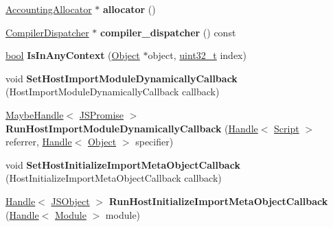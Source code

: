 \begin{DoxyCompactItemize}
\mbox{\label{classv8_1_1internal_1_1Isolate_a5d3cfc27102c773cd317a2c8fdcf499b}} 
\mbox{\hyperlink{classv8_1_1internal_1_1AccountingAllocator}{Accounting\+Allocator}} $\ast$ {\bfseries allocator} ()
\item 
\mbox{\label{classv8_1_1internal_1_1Isolate_a67cf9a3f40027451a7b3eb7627d08e49}} 
\mbox{\hyperlink{classv8_1_1internal_1_1CompilerDispatcher}{Compiler\+Dispatcher}} $\ast$ {\bfseries compiler\+\_\+dispatcher} () const
\item 
\mbox{\label{classv8_1_1internal_1_1Isolate_a03bf582318d32400ee8781a563fc7724}} 
\mbox{\hyperlink{classbool}{bool}} {\bfseries Is\+In\+Any\+Context} (\mbox{\hyperlink{classv8_1_1internal_1_1Object}{Object}} $\ast$object, \mbox{\hyperlink{classuint32__t}{uint32\+\_\+t}} index)
\item 
\mbox{\label{classv8_1_1internal_1_1Isolate_a1867784f4ee11fb127982895683757e7}} 
void {\bfseries Set\+Host\+Import\+Module\+Dynamically\+Callback} (Host\+Import\+Module\+Dynamically\+Callback callback)
\item 
\mbox{\label{classv8_1_1internal_1_1Isolate_a1922b53dfabb19699e52d26011b54444}} 
\mbox{\hyperlink{classv8_1_1internal_1_1MaybeHandle}{Maybe\+Handle}}$<$ \mbox{\hyperlink{classv8_1_1internal_1_1JSPromise}{J\+S\+Promise}} $>$ {\bfseries Run\+Host\+Import\+Module\+Dynamically\+Callback} (\mbox{\hyperlink{classv8_1_1internal_1_1Handle}{Handle}}$<$ \mbox{\hyperlink{classv8_1_1internal_1_1Script}{Script}} $>$ referrer, \mbox{\hyperlink{classv8_1_1internal_1_1Handle}{Handle}}$<$ \mbox{\hyperlink{classv8_1_1internal_1_1Object}{Object}} $>$ specifier)
\item 
\mbox{\label{classv8_1_1internal_1_1Isolate_affa431395e68fd9cc998baee73e76cae}} 
void {\bfseries Set\+Host\+Initialize\+Import\+Meta\+Object\+Callback} (Host\+Initialize\+Import\+Meta\+Object\+Callback callback)
\item 
\mbox{\label{classv8_1_1internal_1_1Isolate_aaa0b214ad094d5a26d80c3f4de90f067}} 
\mbox{\hyperlink{classv8_1_1internal_1_1Handle}{Handle}}$<$ \mbox{\hyperlink{classv8_1_1internal_1_1JSObject}{J\+S\+Object}} $>$ {\bfseries Run\+Host\+Initialize\+Import\+Meta\+Object\+Callback} (\mbox{\hyperlink{classv8_1_1internal_1_1Handle}{Handle}}$<$ \mbox{\hyperlink{classv8_1_1internal_1_1Module}{Module}} $>$ module)

\end{DoxyCompactItemize}
